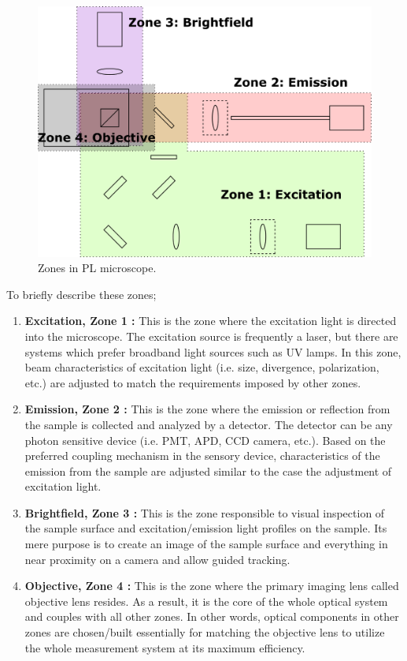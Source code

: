 \begin{figure}[H]
	\centering
	\includegraphics[angle=0,origin=c,width = 0.95\linewidth]{Section_Microscope/Figures/PL_Setup_Zones.png}
	\caption{Zones in PL microscope.}
	\label{fig:ConfocalReflectingMicroscopeZones}
\end{figure}

To briefly describe these zones;

\begin{enumerate}
	\item \textbf{Excitation, Zone 1 :} This is the zone where the excitation light is directed 
	into the microscope. The excitation source is frequently a laser, but there are systems
	which prefer broadband light sources such as UV lamps. In this zone, beam characteristics
	of excitation light (i.e. size, divergence, polarization, etc.) are adjusted to match the
	requirements imposed by other zones.

	\item \textbf{Emission, Zone 2 :} This is the zone where the emission or reflection from
	the sample is collected and analyzed by a detector. The detector can be any photon sensitive
	device (i.e. PMT, APD, CCD camera, etc.). Based on the preferred coupling mechanism in the
	sensory device, characteristics of the emission from the sample are adjusted similar to the 
	case the adjustment of excitation light.
	
	\item \textbf{Brightfield, Zone 3 :} This is the zone responsible to visual inspection of
	the sample surface and excitation/emission light profiles on the sample. Its mere purpose is
	to create an image of the sample surface and everything in near proximity on a camera and 
	allow guided tracking.
	
	\item \textbf{Objective, Zone 4 :} This is the zone where the primary imaging lens called
	objective lens resides. As a result, it is the core of the whole optical system and couples
	with all other zones. In other words, optical components in other zones are chosen/built 
	essentially for matching the objective lens to utilize the whole measurement system at its 
	maximum efficiency.
\end{enumerate}